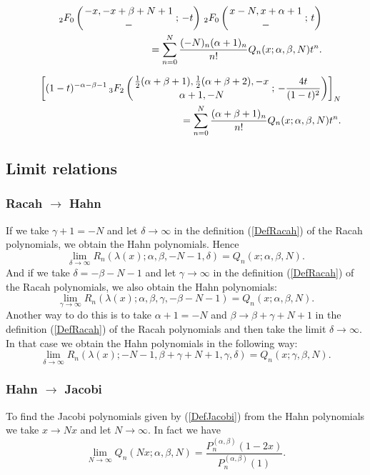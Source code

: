 \documentclass[envcountchap,graybox]{svmono}
\newcounter{rom}
\newcommand{\hyp}[5]{\mbox{}_{#1}{F}_{#2}
\left(\genfrac{}{}{0pt}{}{#3}{#4}\,;\,#5\right)}
\begin{document}
\begin{eqnarray}
\label{GenHahn2}
& &\hyp{2}{0}{-x,-x+\beta+N+1}{-}{-t}\,\hyp{2}{0}{x-N,x+\alpha+1}{-}{t}\nonumber\\
& &{}=\sum_{n=0}^N\frac{(-N)_n(\alpha+1)_n}{n!}Q_n(x;\alpha,\beta,N)t^n.
\end{eqnarray}

\begin{eqnarray}
\label{GenHahn3}
& &\left[(1-t)^{-\alpha-\beta-1}\,\hyp{3}{2}{\frac{1}{2}(\alpha+\beta+1),\frac{1}{2}(\alpha+\beta+2),-x}
{\alpha+1,-N}{-\frac{4t}{(1-t)^2}}\right]_N\nonumber\\
& &{}=\sum_{n=0}^N\frac{(\alpha+\beta+1)_n}{n!}Q_n(x;\alpha,\beta,N)t^n.
\end{eqnarray}

\subsection*{Limit relations}

\subsubsection*{Racah $\rightarrow$ Hahn}
If we take $\gamma+1=-N$ and let $\delta\rightarrow\infty$ in the definition (\ref{DefRacah})
of the Racah polynomials, we obtain the Hahn polynomials. Hence
$$\lim_{\delta\rightarrow\infty}
R_n(\lambda(x);\alpha,\beta,-N-1,\delta)=Q_n(x;\alpha,\beta,N).$$
And if we take $\delta=-\beta-N-1$ and let $\gamma\rightarrow\infty$ in the definition (\ref{DefRacah})
of the Racah polynomials, we also obtain the Hahn polynomials:
$$\lim_{\gamma\rightarrow\infty}
R_n(\lambda(x);\alpha,\beta,\gamma,-\beta-N-1)=Q_n(x;\alpha,\beta,N).$$
Another way to do this is to take $\alpha+1=-N$ and $\beta\rightarrow\beta+\gamma+N+1$ in
the definition (\ref{DefRacah}) of the Racah polynomials and then take the limit
$\delta\rightarrow\infty$. In that case we obtain the Hahn polynomials in the following way:
$$\lim_{\delta\rightarrow\infty}
R_n(\lambda(x);-N-1,\beta+\gamma+N+1,\gamma,\delta)=Q_n(x;\gamma,\beta,N).$$

\subsubsection*{Hahn $\rightarrow$ Jacobi}
To find the Jacobi polynomials given by (\ref{DefJacobi}) from the Hahn polynomials we take
$x\rightarrow Nx$ and let $N\rightarrow\infty$. In fact we have
\begin{equation}
\lim_{N\rightarrow\infty}
Q_n(Nx;\alpha,\beta,N)=\frac{P_n^{(\alpha,\beta)}(1-2x)}{P_n^{(\alpha,\beta)}(1)}.
\end{equation}
\end{document}
